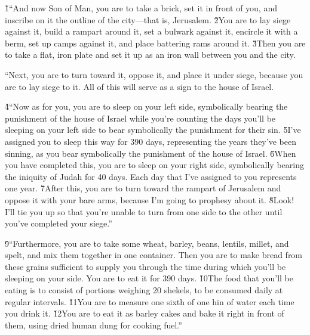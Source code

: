 \v{1}``And now Son of Man, you are to take a brick, set it in front of you, and inscribe on it the outline of the city---that is, Jerusalem. \v{2}You are to lay siege against it, build a rampart around it, set a bulwark against it, encircle it with a berm, set up camps against it, and place battering rams around it. \v{3}Then you are to take a flat, iron plate and set it up as an iron wall between you and the city.

``Next, you are to turn toward it, oppose it, and place it under siege, because you are to lay siege to it. All of this will serve as a sign to the house of Israel.

\v{4}``Now as for you, you are to sleep on your left side, symbolically bearing the punishment of the house of Israel while you're counting the days you'll be sleeping on your left side to bear symbolically the punishment for their sin. \v{5}I've assigned you to sleep this way for 390 days, representing the years they've been sinning, as you bear symbolically the punishment of the house of Israel. \v{6}When you have completed this, you are to sleep on your right side, symbolically bearing the iniquity of Judah for 40 days. Each day that I've assigned to you represents one year. \v{7}After this, you are to turn toward the rampart of Jerusalem and oppose it with your bare arms, because I'm going to prophesy about it. \v{8}Look! I'll tie you up so that you're unable to turn from one side to the other until you've completed your siege.''

\v{9}``Furthermore, you are to take some wheat, barley, beans, lentils, millet, and spelt, and mix them together in one container. Then you are to make bread from these grains sufficient to supply you through the time during which you'll be sleeping on your side. You are to eat it for 390 days. \v{10}The food that you'll be eating is to consist of portions weighing 20 shekels, to be consumed daily at regular intervals. \v{11}You are to measure one sixth of one hin of water each time you drink it. \v{12}You are to eat it as barley cakes and bake it right in front of them, using dried human dung for cooking fuel.''

